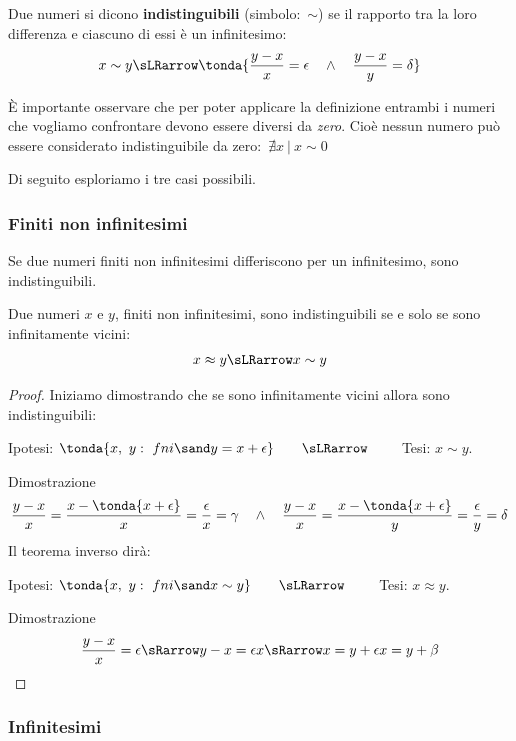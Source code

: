 \begin{definizione}
Due numeri si dicono \textbf{indistinguibili} (simbolo:~$\sim$) se il 
rapporto tra la loro differenza e ciascuno di essi è un infinitesimo:
\[x \sim y \sLRarrow 
\tonda{\frac{y-x}{x} = \epsilon \quad \wedge \quad \frac{y-x}{y} = \delta}
\]
\end{definizione}

\begin{osservazione}
 È importante osservare che per poter applicare la definizione entrambi i 
numeri che vogliamo confrontare devono essere diversi da \emph{zero}.
Cioè nessun numero può essere considerato indistinguibile da 
zero:~\(\nexists x~|~x \sim 0\)
\end{osservazione}

Di seguito esploriamo i tre casi possibili.

\subsubsection{Finiti non infinitesimi}
\label{subsubsec:insnum_finitini}

Se due numeri finiti non infinitesimi differiscono per un 
infinitesimo, sono indistinguibili.

\begin{teorema}
Due numeri $x$ e $y$, finiti non infinitesimi, 
sono indistinguibili se e solo se sono infinitamente vicini:
\[x \approx y \sLRarrow x \sim y\]
\end{teorema}

\begin{proof}
Iniziamo dimostrando che se sono infinitamente vicini allora sono 
indistinguibili:
\begin{center}
Ipotesi: $\tonda{x,~y:\ fni \sand y = x+\epsilon} \qquad \sLRarrow \qquad$ 
Tesi: $x \sim y$.
\end{center}
Dimostrazione
\[\frac{y-x}{x}=\frac{x-\tonda{x+\epsilon}}{x} = 
\frac{\epsilon}{x}= \gamma \quad \wedge \quad 
\frac{y-x}{x}=\frac{x-\tonda{x+\epsilon}}{y} = 
\frac{\epsilon}{y}= \delta
\]
Il teorema inverso dirà:
\begin{center}
Ipotesi: $\tonda{x,~y:\ fni \sand x \sim y} \qquad \sLRarrow \qquad$ 
Tesi: $x \approx y$.
\end{center}
Dimostrazione
\[\frac{y-x}{x} = \epsilon
\sRarrow y-x=\epsilon x \sRarrow x=y+\epsilon x=y+\beta 
\]
\end{proof}

\subsubsection{Infinitesimi}
\label{subsubsec:insnum_infinitesimi}

